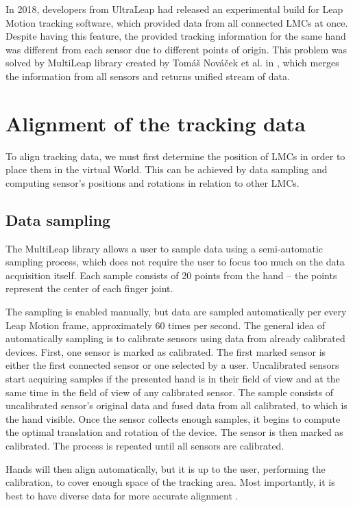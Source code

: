 
In 2018, developers from UltraLeap had released an experimental build for Leap Motion tracking software, which provided data from all connected LMCs at once. Despite having this feature, the provided tracking information for the same hand was different from each sensor due to different points of origin. This problem was solved by MultiLeap library created by Tomáš Nováček et al. in \cite{tomasMultileap}, which merges the information from all sensors and returns unified stream of data. 

\section{Alignment of the tracking data}

To align tracking data, we must first determine the position of LMCs in order to place them in the virtual World. This can be achieved by data sampling and computing sensor's positions and rotations in relation to other LMCs. \cite{tomasMultileap}

\subsection{Data sampling}

The MultiLeap library allows a user to sample data using a semi-automatic sampling process, which does not require the user to focus too much on the data acquisition itself. Each sample consists of 20 points from the hand – the points represent the center of each finger joint. 

The sampling is enabled manually, but data are sampled automatically per every Leap Motion frame, approximately 60 times per second. The general idea of automatically sampling is to calibrate sensors using data from already calibrated devices. First, one sensor is marked as calibrated. The first marked sensor is either the first connected sensor or one selected by a user. Uncalibrated sensors start acquiring samples if the presented hand is in their field of view and at the same time in the field of view of any calibrated sensor. The sample consists of uncalibrated sensor's original data and fused data from all calibrated, to which is the hand visible. Once the sensor collects enough samples, it begins to compute the optimal translation and rotation of the device. The sensor is then marked as calibrated. The process is repeated until all sensors are calibrated. \cite{tomasMultileap}


Hands will then align automatically, but it is up to the user, performing the calibration, to cover enough space of the tracking area. Most importantly, it is best to have diverse data for more accurate alignment \cite{tomasMultileap}.

